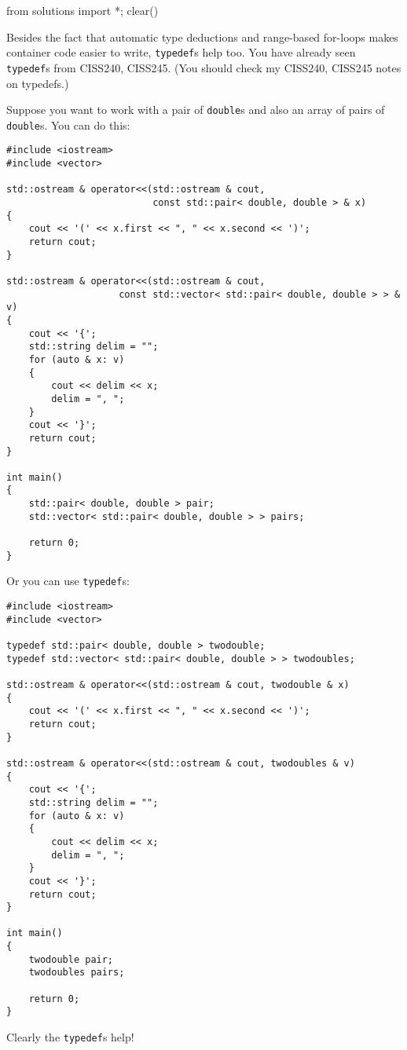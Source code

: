 \begin{python0}
from solutions import *; clear()
\end{python0}

Besides the fact that automatic type deductions and
range-based for-loops makes container code easier to write,
\texttt{typedef}s help too.
You have already seen \texttt{typedef}s from CISS240, CISS245.
(You should check my CISS240, CISS245 notes on typedefs.)

Suppose you want to work with a pair of \verb!double!s
and also an array of pairs of \verb!double!s.
You can do this:
\begin{Verbatim}[frame=single,fontsize=\footnotesize]
#include <iostream>
#include <vector>

std::ostream & operator<<(std::ostream & cout,
                          const std::pair< double, double > & x)
{
    cout << '(' << x.first << ", " << x.second << ')';
    return cout;
}

std::ostream & operator<<(std::ostream & cout,
                    const std::vector< std::pair< double, double > > & v)
{
    cout << '{';
    std::string delim = "";
    for (auto & x: v)
    {
        cout << delim << x;
        delim = ", ";
    }
    cout << '}';
    return cout;
}

int main()
{
    std::pair< double, double > pair;
    std::vector< std::pair< double, double > > pairs;
      
    return 0;
}
\end{Verbatim}
Or you can use \texttt{typedef}s:
\begin{Verbatim}[frame=single,fontsize=\footnotesize]
#include <iostream>
#include <vector>

typedef std::pair< double, double > twodouble;
typedef std::vector< std::pair< double, double > > twodoubles;

std::ostream & operator<<(std::ostream & cout, twodouble & x)
{
    cout << '(' << x.first << ", " << x.second << ')';
    return cout;
}

std::ostream & operator<<(std::ostream & cout, twodoubles & v)
{
    cout << '{';
    std::string delim = "";
    for (auto & x: v)
    {
        cout << delim << x;
        delim = ", ";
    }
    cout << '}';
    return cout;
}

int main()
{
    twodouble pair;
    twodoubles pairs;
      
    return 0;
}
\end{Verbatim}

Clearly the \texttt{typedef}s help!
